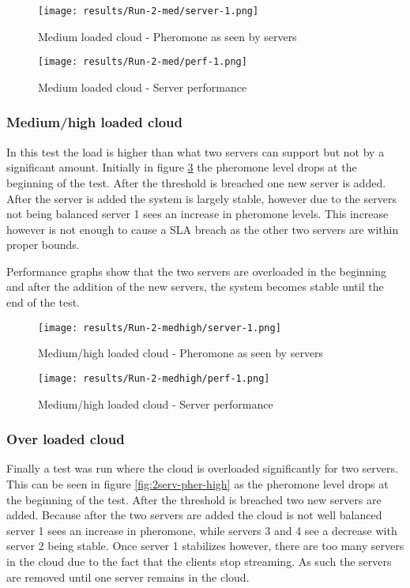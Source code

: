 \begin{figure}
	\centering
		\texttt{[image: results/Run-2-med/server-1.png]}
	\caption{Medium loaded cloud - Pheromone as seen by servers}
	\label{fig:2serv-pher-med}
\end{figure}

\begin{figure}
	\centering
		\texttt{[image: results/Run-2-med/perf-1.png]}
	\caption{Medium loaded cloud - Server performance}
	\label{fig:2serv-perf-med}
\end{figure}

\subsubsection{Medium/high loaded cloud}

In this test the load is higher than what two servers can support but not by a significant amount. Initially in figure \ref{fig:2serv-pher-medhigh} the pheromone level drops at the beginning of the test. After the threshold is breached one new server is added. After the server is added the system is largely stable, however due to the servers not being balanced server 1 sees an increase in pheromone levels. This increase however is not enough to cause a SLA breach as the other two servers are within proper bounds.

Performance graphs show that the two servers are overloaded in the beginning and after the addition of the new servers, the system becomes stable until the end of the test.

\begin{figure}
	\centering
		\texttt{[image: results/Run-2-medhigh/server-1.png]}
	\caption{Medium/high loaded cloud - Pheromone as seen by servers}
	\label{fig:2serv-pher-medhigh}
\end{figure}

\begin{figure}
	\centering
		\texttt{[image: results/Run-2-medhigh/perf-1.png]}
	\caption{Medium/high loaded cloud - Server performance}
	\label{fig:2serv-perf-medhigh}
\end{figure}

\subsubsection{Over loaded cloud}

Finally a test was run where the cloud is overloaded significantly for two servers. This can be seen in figure \ref{fig:2serv-pher-high} as the pheromone level drops at the beginning of the test. After the threshold is breached two new servers are added. Because after the two servers are added the cloud is not well balanced server 1 sees an increase in pheromone, while servers 3 and 4 see a decrease with server 2 being stable. Once server 1 stabilizes however, there are too many servers in the cloud due to the fact that the clients stop streaming. As such the servers are removed until one server remains in the cloud.

